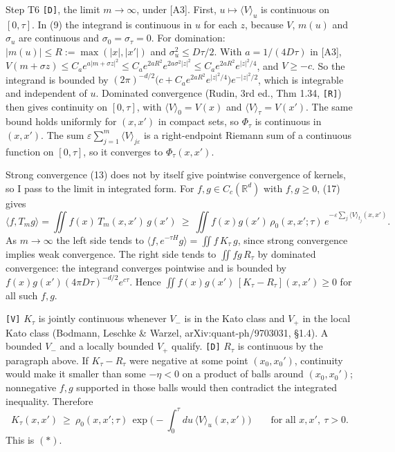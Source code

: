 \documentclass[11pt,a4paper]{article}
\begin{document}
Step T6 \texttt{[D]}, the limit \(m\to\infty\), under {[}A3{]}. First, \(u\mapsto\langle V\rangle_u\) is continuous on \([0,\tau]\). In (9) the integrand is continuous in \(u\) for each \(z\), because \(V\), \(m(u)\) and \(\sigma_u\) are continuous and \(\sigma_0=\sigma_\tau=0\). For domination: \(|m(u)|\le R:=\max(|x|,|x'|)\) and \(\sigma_u^2\le D\tau/2\). With \(a=1/(4D\tau)\) in {[}A3{]}, \(V(m+\sigma z)\le C_a e^{a|m+\sigma z|^2}\le C_ae^{2aR^2}e^{2a\sigma^2|z|^2}\le C_ae^{2aR^2}e^{|z|^2/4}\), and \(V\ge-c\). So the integrand is bounded by \((2\pi)^{-d/2}\big(c+C_ae^{2aR^2}e^{|z|^2/4}\big)e^{-|z|^2/2}\), which is integrable and independent of \(u\). Dominated convergence (Rudin, 3rd ed., Thm 1.34, \texttt{[R]}) then gives continuity on \([0,\tau]\), with \(\langle V\rangle_0=V(x)\) and \(\langle V\rangle_\tau=V(x')\). The same bound holds uniformly for \((x,x')\) in compact sets, so \(\Phi_\tau\) is continuous in \((x,x')\). The sum \(\varepsilon\sum_{j=1}^m\langle V\rangle_{j\varepsilon}\) is a right-endpoint Riemann sum of a continuous function on \([0,\tau]\), so it converges to \(\Phi_\tau(x,x')\).

Strong convergence (13) does not by itself give pointwise convergence of kernels, so I pass to the limit in integrated form. For \(f,g\in C_c(\mathbb R^d)\) with \(f,g\ge0\), (17) gives
\[\langle f,T_mg\rangle=\iint f(x)\,T_m(x,x')\,g(x')\ \ge\ \iint f(x)g(x')\,\rho_0(x,x';\tau)\,e^{-\varepsilon\sum_j\langle V\rangle_{t_j}(x,x')}.\]
As \(m\to\infty\) the left side tends to \(\langle f,e^{-\tau H}g\rangle=\iint f\,K_\tau\,g\), since strong convergence implies weak convergence. The right side tends to \(\iint fg\,R_\tau\) by dominated convergence: the integrand converges pointwise and is bounded by \(f(x)g(x')(4\pi D\tau)^{-d/2}e^{c\tau}\). Hence \(\iint f(x)g(x')\,[K_\tau-R_\tau](x,x')\ge0\) for all such \(f,g\).

\texttt{[V]} \(K_\tau\) is jointly continuous whenever \(V_-\) is in the Kato class and \(V_+\) in the local Kato class (Bodmann, Leschke \& Warzel, arXiv:quant-ph/9703031, §1.4). A bounded \(V_-\) and a locally bounded \(V_+\) qualify. \texttt{[D]} \(R_\tau\) is continuous by the paragraph above. If \(K_\tau-R_\tau\) were negative at some point \((x_0,x_0')\), continuity would make it smaller than some \(-\eta<0\) on a product of balls around \((x_0,x_0')\); nonnegative \(f,g\) supported in those balls would then contradict the integrated inequality. Therefore
\[K_\tau(x,x')\ \ge\ \rho_0(x,x';\tau)\,\exp\Big(-\int_0^\tau du\,\langle V\rangle_u(x,x')\Big)\qquad\text{for all }x,x',\ \tau>0.\tag{18}\]
This is \((\ast)\).
\end{document}
